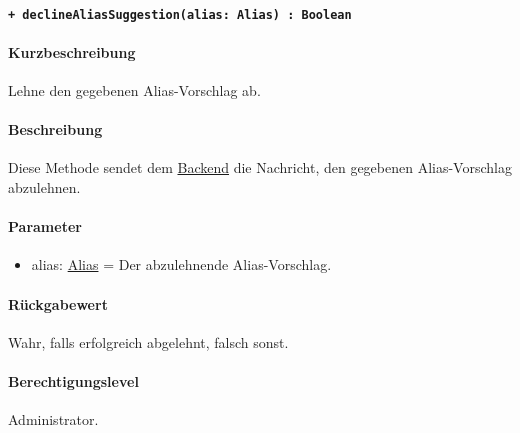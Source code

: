 \paragraph{\texttt{+ declineAliasSuggestion(alias: Alias) : Boolean}}\label{AP_Framework_declineAliasSuggestion}%
\paragraph*{Kurzbeschreibung}
Lehne den gegebenen Alias-Vorschlag ab.
\paragraph*{Beschreibung}
Diese Methode sendet dem \hyperref[AP_Backend]{Backend} die Nachricht, den gegebenen Alias-Vorschlag abzulehnen.
\paragraph*{Parameter}
\begin{itemize}
    \item alias: \hyperref[AP_Alias]{Alias} = Der abzulehnende Alias-Vorschlag.
\end{itemize}
\paragraph*{Rückgabewert}
Wahr, falls erfolgreich abgelehnt, falsch sonst.
\paragraph*{Berechtigungslevel}
Administrator.